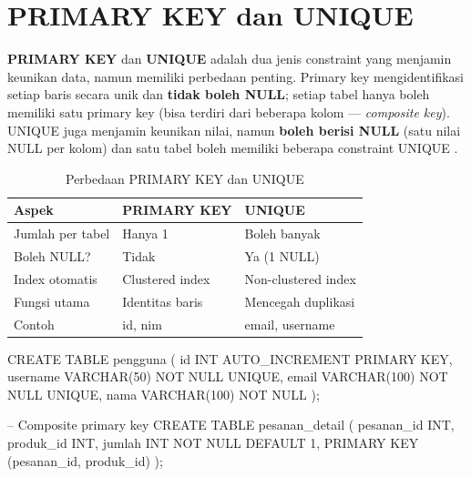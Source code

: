 \section{PRIMARY KEY dan UNIQUE}

\textbf{PRIMARY KEY} dan \textbf{UNIQUE} adalah dua jenis constraint yang menjamin keunikan data, namun memiliki perbedaan penting. Primary key mengidentifikasi setiap baris secara unik dan \textbf{tidak boleh NULL}; setiap tabel hanya boleh memiliki satu primary key (bisa terdiri dari beberapa kolom --- \textit{composite key}). UNIQUE juga menjamin keunikan nilai, namun \textbf{boleh berisi NULL} (satu nilai NULL per kolom) dan satu tabel boleh memiliki beberapa constraint UNIQUE \cite{mysqlDocs}.

\begin{table}[ht]
\centering
\begin{tabular}{|P{3.5cm}|P{5cm}|P{5cm}|}
\hline
\textbf{Aspek} & \textbf{PRIMARY KEY} & \textbf{UNIQUE} \\
\hline
Jumlah per tabel & Hanya 1 & Boleh banyak \\
\hline
Boleh NULL? & Tidak & Ya (1 NULL) \\
\hline
Index otomatis & Clustered index & Non-clustered index \\
\hline
Fungsi utama & Identitas baris & Mencegah duplikasi \\
\hline
Contoh & id, nim & email, username \\
\hline
\end{tabular}
\caption{Perbedaan PRIMARY KEY dan UNIQUE}
\end{table}

\begin{webcode}[language=SQL, caption={Penggunaan PRIMARY KEY dan UNIQUE}]
CREATE TABLE pengguna (
  id       INT AUTO_INCREMENT PRIMARY KEY,
  username VARCHAR(50) NOT NULL UNIQUE,
  email    VARCHAR(100) NOT NULL UNIQUE,
  nama     VARCHAR(100) NOT NULL
);

-- Composite primary key
CREATE TABLE pesanan_detail (
  pesanan_id INT,
  produk_id  INT,
  jumlah     INT NOT NULL DEFAULT 1,
  PRIMARY KEY (pesanan_id, produk_id)
);
\end{webcode}

